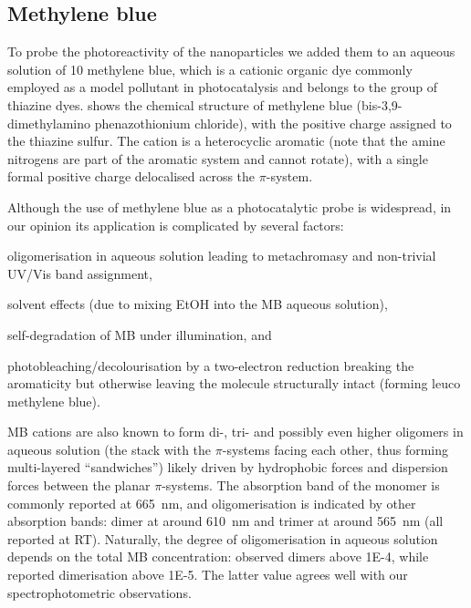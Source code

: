 \documentclass[9pt,twoside,twocolumn]{article}\usepackage{knitr}
\begin{document}
\begin{refsection}
\subsection{Methylene blue}

To probe the photoreactivity of the  nanoparticles we added them to an aqueous solution of \qty{10}{\micromolar} methylene blue, which is a cationic organic dye commonly employed as a model pollutant in photocatalysis \cite{Schubert1955}  and belongs to the group of thiazine dyes.
 shows the chemical structure of methylene blue (bis-3,9-dimethylamino phenazothionium chloride), with the positive charge assigned to the thiazine sulfur.
The cation is a heterocyclic aromatic (note that the amine nitrogens are part of the aromatic system and cannot rotate), with a single formal positive charge delocalised across the $\pi$-system.

Although the use of methylene blue as a photocatalytic probe is widespread, in our opinion its application is complicated by several factors: %
\begin{enumerate*}[label=\alph*)]%
\item oligomerisation in aqueous solution leading to metachromasy and non-trivial UV/Vis band assignment,
\item solvent effects (due to mixing EtOH into the MB aqueous solution),
\item self-degradation of MB under illumination, and
\item photobleaching/decolourisation by a two-electron reduction breaking the aromaticity but otherwise leaving the molecule structurally intact (forming leuco methylene blue).
\end{enumerate*}

MB cations are also known to form di-, tri- and possibly even higher oligomers in aqueous solution (the  stack with the $\pi$-systems facing each other, thus forming multi-layered \enquote{sandwiches}) likely driven by hydrophobic forces and dispersion forces between the planar $\pi$-systems. \cite{Cenens1988,Braswell1968,Schubert1955}
The absorption band of the monomer is commonly reported at \qty{665}{\nm}, \cite{Heger2005,Cenens1988} and oligomerisation is indicated by other absorption bands: dimer at around \qty{610}{\nm} \cite{Heger2005,Jockusch1995,Ruprecht1984} and trimer at around \qty{565}{\nm} \cite{Heger2005} (all reported at RT). Naturally, the degree of oligomerisation in aqueous solution depends on the total MB concentration: 
\textcite{Heger2005} observed dimers above \qty{1E-4}{\molar}, while \textcite{Jockusch1995} reported dimerisation above \qty{1E-5}{\molar}. The latter value agrees well with our spectrophotometric observations.


\end{refsection}
\end{document}
